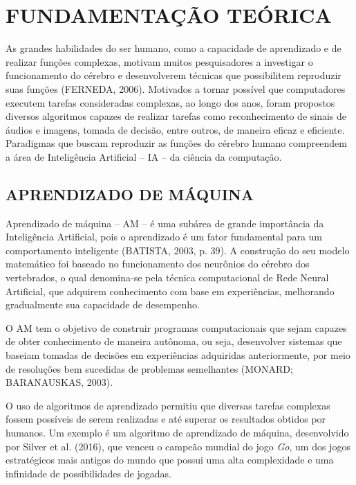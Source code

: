 
\chapter{FUNDAMENTAÇÃO TEÓRICA}
\label{chap:fundamentacaoTeorica}

As grandes habilidades do ser humano, como a capacidade de aprendizado e de realizar funções complexas, motivam muitos pesquisadores a investigar o funcionamento do cérebro e desenvolverem técnicas que possibilitem reproduzir suas
funções (FERNEDA, 2006). Motivados a tornar possível que computadores executem tarefas consideradas complexas, ao longo dos anos, foram propostos diversos algoritmos capazes de realizar tarefas como reconhecimento de sinais de áudios e imagens, tomada de decisão, entre outros, de maneira eficaz e eficiente. Paradigmas que buscam reproduzir as funções do cérebro humano compreendem a área de Inteligência Artificial – IA – da ciência da computação.

\section{APRENDIZADO DE MÁQUINA}
\label{sec:titSecAprenMaquina}

Aprendizado de máquina – AM – é uma subárea de grande importância da Inteligência Artificial, pois o aprendizado é um fator fundamental para um comportamento inteligente (BATISTA, 2003, p. 39). A construção do seu modelo matemático foi baseado no funcionamento dos neurônios do cérebro dos vertebrados, o qual denomina-se pela técnica computacional de Rede Neural Artificial, que adquirem conhecimento com base em experiências, melhorando gradualmente sua capacidade de desempenho.

O AM tem o objetivo de construir programas computacionais que sejam capazes de obter conhecimento de maneira autônoma, ou seja, desenvolver sistemas que baseiam tomadas de decisões em experiências adquiridas anteriormente, por meio de resoluções bem sucedidas de problemas semelhantes (MONARD; BARANAUSKAS, 2003).

O uso de algoritmos de aprendizado permitiu que diversas tarefas complexas fossem possíveis de serem realizadas e até superar os resultados obtidos por humanos. Um exemplo é um algoritmo de aprendizado de máquina, desenvolvido por Silver et al. (2016), que venceu o campeão mundial do jogo \textit{Go}, um dos jogos estratégicos mais antigos do mundo que possui uma alta complexidade e uma infinidade de possibilidades de jogadas.

